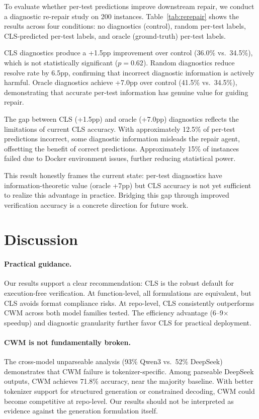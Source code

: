 \documentclass[11pt]{article}
\begin{document}
To evaluate whether per-test predictions improve downstream repair, we conduct a diagnostic re-repair study on 200 instances. Table~\ref{tab:rerepair} shows the results across four conditions: no diagnostics (control), random per-test labels, CLS-predicted per-test labels, and oracle (ground-truth) per-test labels.

CLS diagnostics produce a +1.5pp improvement over control (36.0\% vs.\ 34.5\%), which is not statistically significant ($p{=}0.62$). Random diagnostics reduce resolve rate by 6.5pp, confirming that incorrect diagnostic information is actively harmful. Oracle diagnostics achieve +7.0pp over control (41.5\% vs.\ 34.5\%), demonstrating that accurate per-test information has genuine value for guiding repair.

The gap between CLS (+1.5pp) and oracle (+7.0pp) diagnostics reflects the limitations of current CLS accuracy. With approximately 12.5\% of per-test predictions incorrect, some diagnostic information misleads the repair agent, offsetting the benefit of correct predictions. Approximately 15\% of instances failed due to Docker environment issues, further reducing statistical power.

This result honestly frames the current state: per-test diagnostics have information-theoretic value (oracle +7pp) but CLS accuracy is not yet sufficient to realize this advantage in practice. Bridging this gap through improved verification accuracy is a concrete direction for future work.

\section{Discussion}

\paragraph{Practical guidance.} Our results support a clear recommendation: CLS is the robust default for execution-free verification. At function-level, all formulations are equivalent, but CLS avoids format compliance risks. At repo-level, CLS consistently outperforms CWM across both model families tested. The efficiency advantage (6--9$\times$ speedup) and diagnostic granularity further favor CLS for practical deployment.

\paragraph{CWM is not fundamentally broken.} The cross-model unparseable analysis (93\% Qwen3 vs.\ 52\% DeepSeek) demonstrates that CWM failure is tokenizer-specific. Among parseable DeepSeek outputs, CWM achieves 71.8\% accuracy, near the majority baseline. With better tokenizer support for structured generation or constrained decoding, CWM could become competitive at repo-level. Our results should not be interpreted as evidence against the generation formulation itself.
\end{document}
